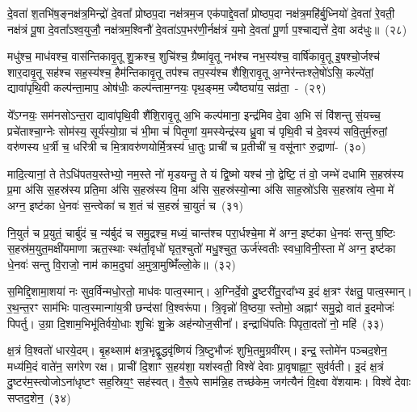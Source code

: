 दे॒वता॑ श॒तभि॑ष॒ङ्नक्ष॑त्र॒मिन्द्रो॑ दे॒वता᳚ प्रोष्ठप॒दा नक्ष॑त्रम॒ज एक॑पाद्दे॒वता᳚ प्रोष्ठप॒दा नक्ष॑त्र॒महि॑र्बु॒ध्नियो॑ दे॒वता॑ रे॒वती॒ नक्ष॑त्रं पू॒षा दे॒वता᳚\-ऽ\-श्व॒युजौ॒ नक्ष॑त्रम॒श्विनौ॑ दे॒वता॑ऽप॒\-भर॑णी॒र्नक्ष॑त्रं य॒मो दे॒वता॑ पू॒र्णा प॒श्चाद्यत्ते॑ दे॒वा अद॑धुः॥~(२८)\ip

{\anuvakamend[{फल्गु॑नी॒ नक्ष॑त्रं॒ वस॑व॒स्त्रय॑स्त्रिꣳशच्च}]}%

मधु॑श्च॒ माध॑वश्च॒ वास॑न्तिकावृ॒तू शु॒क्रश्च॒ शुचि॑श्च॒ ग्रैष्मा॑वृ॒तू नभ॑श्च नभ॒स्य॑श्च॒ वार्\mbox{}षि॑कावृ॒तू इ॒षश्चो॒र्जश्च॑ शार॒दावृ॒तू सह॑श्च सह॒स्य॑श्च॒ हैम॑न्तिकावृ॒तू तप॑श्च तप॒स्य॑श्च शैशि॒रावृ॒तू अ॒ग्नेर॑न्तःश्ले॒षो॑\-ऽसि॒ कल्पे॑तां॒ द्यावा॑\-पृथि॒वी कल्प॑न्ता॒माप॒ ओष॑धीः॒ कल्प॑न्ताम॒ग्नयः॒ पृथ॒ङ्मम॒ ज्यैष्ठ्या॑य॒ सव्र॑ता॒~-~(२९)\ip

ये᳚\-ऽग्नयः॒ सम॑नसो\-ऽन्त॒रा द्यावा॑\-पृथि॒वी शै॑शि॒रावृ॒तू अ॒भि कल्प॑माना॒ इन्द्र॑मिव दे॒वा अ॒भि सं वि॑शन्तु सं॒यच्च॒ प्रचे॑ताश्चा॒ग्नेः सोम॑स्य॒ सूर्य॑स्यो॒ग्रा च॑ भी॒मा च॑ पितृ॒णां य॒मस्येन्द्र॑स्य ध्रु॒वा च॑ पृथि॒वी च॑ दे॒वस्य॑ सवि॒तुर्म॒रुतां॒ वरु॑णस्य ध॒र्त्री च॒ धरि॑त्री च मि॒त्रावरु॑णयोर्मि॒त्रस्य॑ धा॒तुः प्राची॑ च प्र॒तीची॑ च॒ वसू॑नाꣳ रु॒द्राणा॑-~(३०)\ip

मादि॒त्यानां॒ ते ते\-ऽधि॑पतय॒स्तेभ्यो॒ नम॒स्ते नो॑ मृडयन्तु॒ ते यं द्वि॒ष्मो यश्च॑ नो॒ द्वेष्टि॒ तं वो॒ जम्भे॑ दधामि स॒हस्र॑स्य प्र॒मा अ॑सि स॒हस्र॑स्य प्रति॒मा अ॑सि स॒हस्र॑स्य वि॒मा अ॑सि स॒हस्र॑स्यो॒न्मा अ॑सि साह॒स्रो॑\-ऽसि स॒हस्रा॑य त्वे॒मा मे॑ अग्न॒ इष्ट॑का धे॒नवः॑ स॒न्त्वेका॑ च श॒तं च॑ स॒हस्रं॑ चा॒युतं॑ च~(३१)\ip

नि॒युतं॑ च प्र॒युतं॒ चार्बु॑दं च॒ न्य॑र्बुदं च समु॒द्रश्च॒ मध्यं॒ चान्त॑श्च परा॒र्धश्चे॒मा मे॑ अग्न॒ इष्ट॑का धे॒नवः॑ सन्तु ष॒ष्टिः स॒हस्र॑म॒युत॒मक्षी॑यमाणा ऋत॒स्थाः स्थ॑र्ता॒वृधो॑ घृत॒श्चुतो॑ मधु॒श्चुत॒ ऊर्ज॑स्वतीः स्वधा॒विनी॒स्ता मे॑ अग्न॒ इष्ट॑का धे॒नवः॑ सन्तु वि॒राजो॒ नाम॑ काम॒दुघा॑ अ॒मुत्रा॒मुष्मिँ॑ल्लो॒के॥~(३२)\ip

{\anuvakamend[{सव्र॑ता रु॒द्राणा॑म॒युतं॑ च॒ पञ्च॑चत्वारिꣳशच्च}]}%

स॒मिद्दि॒शामा॒शया॑ नः सुव॒र्विन्मधो॒रतो॒ माध॑वः पात्व॒स्मान्। अ॒ग्निर्दे॒वो दु॒ष्टरी॑तु॒रदा᳚भ्य इ॒दं क्ष॒त्रꣳ र॑क्षतु॒ पात्व॒स्मान्। र॒थ॒न्त॒रꣳ साम॑भिः पात्व॒स्मान्गा॑य॒त्री छन्द॑सां वि॒श्वरू॑पा। त्रि॒वृन्नो॑ वि॒ष्ठया॒ स्तोमो॒ अह्नाꣳ॑ समु॒द्रो वात॑ इ॒दमोजः॑ पिपर्तु। उ॒ग्रा दि॒शाम॒भिभू॑तिर्वयो॒धाः शुचिः॑ शु॒क्रे अह॑न्योज॒सीना᳚। इन्द्राधि॑\-पतिः पिपृता॒दतो॑ नो॒ महि॑~(३३)\ip

क्ष॒त्रं वि॒श्वतो॑ धारये॒दम्। बृ॒हथ्साम॑ क्षत्र॒भृद्वृ॒द्धवृ॑ष्णियं त्रि॒ष्टुभौजः॑ शुभि॒तमु॒ग्रवी॑रम्। इन्द्र॒ स्तोमे॑न पञ्चद॒शेन॒ मध्य॑मि॒दं वाते॑न॒ सग॑रेण रक्ष। प्राची॑ दि॒शाꣳ स॒हय॑शा॒ यश॑स्वती॒ विश्वे॑ देवाः प्रा॒वृषाह्ना॒ꣳ॒ सुव॑र्वती। इ॒दं क्ष॒त्रं दु॒ष्टर॑म॒स्त्वोजो\-ऽना॑धृष्टꣳ सह॒स्रिय॒ꣳ॒ सह॑स्वत्। वै॒रू॒पे साम॑न्नि॒ह तच्छ॑केम॒ जग॑त्यैनं वि॒क्ष्वा वे॑शयामः। विश्वे॑ देवाः सप्तद॒शेन॒~(३४)\ip

